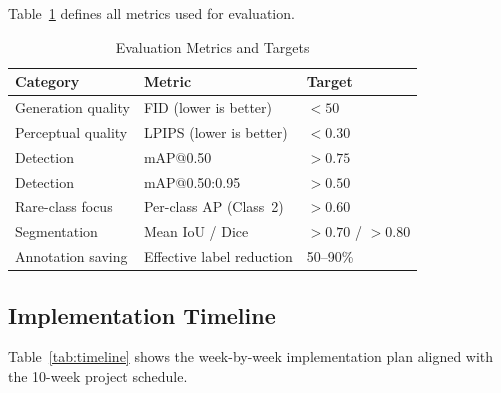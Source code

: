 \documentclass[conference]{IEEEtran}
\begin{document}
Table~\ref{tab:metrics} defines all metrics used for evaluation.

\begin{table}[h]
\centering
\caption{Evaluation Metrics and Targets}
\label{tab:metrics}
\renewcommand{\arraystretch}{1.2}
\begin{tabularx}{\columnwidth}{l X l}
\toprule
\textbf{Category} & \textbf{Metric} & \textbf{Target} \\
\midrule
Generation quality  & FID (lower is better)         & $<50$ \\
Perceptual quality  & LPIPS (lower is better)       & $<0.30$ \\
Detection           & mAP@0.50                      & $>0.75$ \\
Detection           & mAP@0.50:0.95                 & $>0.50$ \\
Rare-class focus    & Per-class AP (Class~2)        & $>0.60$ \\
Segmentation        & Mean IoU / Dice               & $>0.70$ / $>0.80$ \\
Annotation saving   & Effective label reduction     & 50--90\% \\
\bottomrule
\end{tabularx}
\end{table}

\subsection{Implementation Timeline}

Table~\ref{tab:timeline} shows the week-by-week implementation plan
aligned with the 10-week project schedule.
\end{document}
